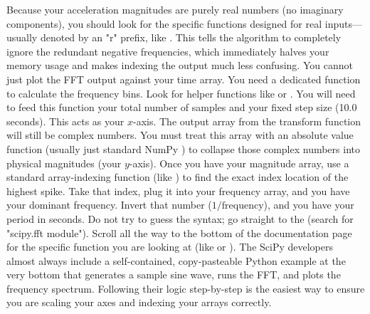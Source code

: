 {}\markdownRendererUlBegin
\markdownRendererUlItem {} Because your acceleration magnitudes are purely real numbers (no imaginary components), you should look for the specific functions designed for real inputs—usually denoted by an "r" prefix, like . This tells the algorithm to completely ignore the redundant negative frequencies, which immediately halves your memory usage and makes indexing the output much less confusing.\markdownRendererUlItemEnd 
\markdownRendererUlItem {} You cannot just plot the FFT output against your time array. You need a dedicated function to calculate the frequency bins. Look for helper functions like  or . You will need to feed this function your total number of samples and your fixed step size (10.0 seconds). This acts as your $x$-axis.\markdownRendererUlItemEnd 
\markdownRendererUlItem {} The output array from the transform function will still be complex numbers. You must treat this array with an absolute value function (usually just standard NumPy ) to collapse those complex numbers into physical magnitudes (your $y$-axis).\markdownRendererUlItemEnd 
\markdownRendererUlItem {} Once you have your magnitude array, use a standard array-indexing function (like ) to find the exact index location of the highest spike.\markdownRendererUlItemEnd 
\markdownRendererUlItem {} Take that index, plug it into your frequency array, and you have your dominant frequency. Invert that number ($1 / \text{frequency}$), and you have your period in seconds.\markdownRendererUlItemEnd 
\markdownRendererUlEnd \markdownRendererInterblockSeparator
{}
\markdownRendererSectionEnd \markdownRendererSectionBegin
{}\markdownRendererInterblockSeparator
{}Do not try to guess the syntax; go straight to the  (search for "scipy.fft module").\markdownRendererInterblockSeparator
{} Scroll all the way to the bottom of the documentation page for the specific function you are looking at (like  or ). The SciPy developers almost always include a self-contained, copy-pasteable Python example at the very bottom that generates a sample sine wave, runs the FFT, and plots the frequency spectrum. Following their logic step-by-step is the easiest way to ensure you are scaling your axes and indexing your arrays correctly.\markdownRendererInterblockSeparator
